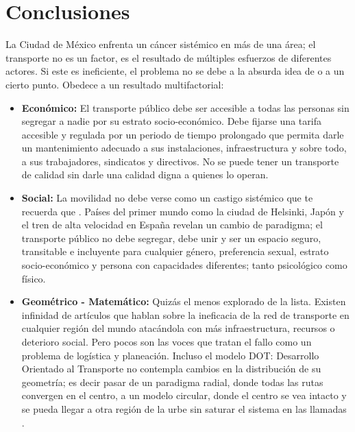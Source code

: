 
\section{Conclusiones}
\label{sec:conclusiones}

La Ciudad de México enfrenta un cáncer sistémico en más de una área; el transporte no es un factor, 
es el resultado de múltiples esfuerzos de diferentes actores. Si este es ineficiente, el problema no 
se debe a la absurda idea de  o 
 a un cierto punto. Obedece a un resultado multifactorial: 
\begin{itemize}
    \item \textbf{Económico:} El transporte público debe ser accesible a todas las personas sin segregar a nadie por su
            estrato socio-económico. Debe fijarse una tarifa accesible y regulada por un periodo de tiempo prolongado
            que permita darle un mantenimiento adecuado a sus instalaciones, infraestructura y sobre todo, a sus trabajadores,
            sindicatos y directivos. No se puede tener un transporte de calidad sin darle una calidad digna a quienes lo operan.

    \item \textbf{Social:} La movilidad no debe verse como un castigo sistémico que te recuerda que . 
            Países del primer mundo como la ciudad de Helsinki, Japón y el tren de alta velocidad en España revelan un cambio 
            de paradigma; el transporte público no debe segregar, debe unir y ser un espacio seguro, transitable e incluyente para 
            cualquier género, preferencia sexual, estrato socio-económico y persona con capacidades diferentes; 
            tanto psicológico como físico.

    \item \textbf{Geométrico - Matemático:} Quizás el menos explorado de la lista. Existen infinidad de artículos que hablan sobre la 
            ineficacia de la red de transporte en cualquier región del mundo atacándola con más infraestructura, recursos o deterioro social. 
            Pero pocos son las voces que tratan el fallo como un problema de logística y planeación. Incluso el modelo DOT: Desarrollo Orientado 
            al Transporte no contempla cambios en la distribución de su geometría; es decir pasar de un paradigma radial, donde todas las rutas 
            convergen en el centro, a un modelo circular, donde el centro se vea intacto y se pueda llegar a otra región de la urbe sin saturar 
            el sistema en las llamadas .


\end{itemize}
